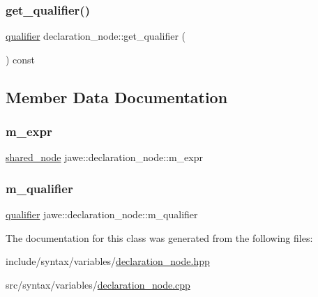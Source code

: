 \mbox{\label{classjawe_1_1declaration__node_a55b9f60f34d212df4ee7e2a96a372d1f}} 
\subsubsection{\texorpdfstring{get\+\_\+qualifier()}{get\_qualifier()}}
{\footnotesize\ttfamily \hyperlink{namespacejawe_aeebd1dfc752b79ba7f0483883a839a1e}{qualifier} declaration\+\_\+node\+::get\+\_\+qualifier (\begin{DoxyParamCaption}{ }\end{DoxyParamCaption}) const}



\subsection{Member Data Documentation}
\mbox{\label{classjawe_1_1declaration__node_a07f4d07f9c057ae5ea2591894b447911}} 
\subsubsection{\texorpdfstring{m\+\_\+expr}{m\_expr}}
{\footnotesize\ttfamily \hyperlink{namespacejawe_a3f307481d921b6cbb50cc8511fc2b544}{shared\+\_\+node} jawe\+::declaration\+\_\+node\+::m\+\_\+expr\hspace{0.3cm}{\ttfamily [private]}}

\mbox{\label{classjawe_1_1declaration__node_aa5647d8c9d733c66d4a9d22486a3b026}} 
\subsubsection{\texorpdfstring{m\+\_\+qualifier}{m\_qualifier}}
{\footnotesize\ttfamily \hyperlink{namespacejawe_aeebd1dfc752b79ba7f0483883a839a1e}{qualifier} jawe\+::declaration\+\_\+node\+::m\+\_\+qualifier\hspace{0.3cm}{\ttfamily [private]}}



The documentation for this class was generated from the following files\+:\begin{DoxyCompactItemize}
\item 
include/syntax/variables/\hyperlink{declaration__node_8hpp}{declaration\+\_\+node.\+hpp}\item 
src/syntax/variables/\hyperlink{declaration__node_8cpp}{declaration\+\_\+node.\+cpp}\end{DoxyCompactItemize}
